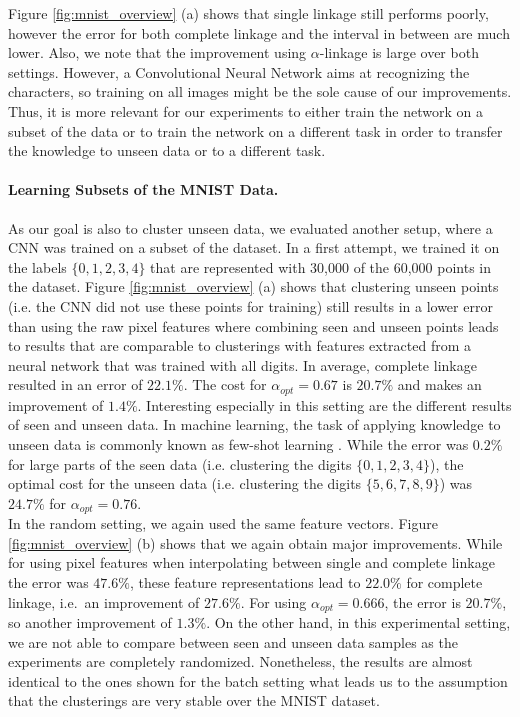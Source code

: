 Figure \ref{fig:mnist_overview} (a) shows that single linkage still performs poorly, however the error for both complete linkage and the interval in between are much lower. Also, we note that the improvement using $\alpha$-linkage is large over both settings. However, a Convolutional Neural Network aims at recognizing the characters, so training on all images might be the sole cause of our improvements. Thus, it is more relevant for our experiments to either train the network on a subset of the data or to train the network on a different task in order to transfer the knowledge to unseen data or to a different task.

\paragraph{Learning Subsets of the MNIST Data.} As our goal is also to cluster unseen data, we evaluated another setup, where a CNN was trained on a subset of the dataset. In a first attempt, we trained it on the labels $\{0,1,2,3,4\}$ that are represented with 30,000 of the 60,000 points in the dataset. Figure \ref{fig:mnist_overview} (a) shows that clustering unseen points (i.e. the CNN did not use these points for training) still results in a lower error than using the raw pixel features where combining seen and unseen points leads to results that are comparable to clusterings with features extracted from a neural network that was trained with all digits. In average, complete linkage resulted in an error of $22.1\%$. The cost for $\alpha_{opt} = 0.67$ is $20.7\%$ and makes an improvement of $1.4\%$. Interesting especially in this setting are the different results of seen and unseen data. In machine learning, the task of applying knowledge to unseen data is commonly known as few-shot learning \cite{ren2018meta}. While the error was $0.2\%$ for large parts of the seen data (i.e. clustering the digits $\{0,1,2,3,4\}$), the optimal cost for the unseen data (i.e. clustering the digits $\{5,6,7,8,9\}$) was $24.7\%$ for $\alpha_{opt} = 0.76$.\\

In the random setting, we again used the same feature vectors. Figure \ref{fig:mnist_overview} (b) shows that we again obtain major improvements. While for using pixel features when interpolating between single and complete linkage the error was $47.6\%$, these feature representations lead to $22.0\%$ for complete linkage, i.e.\ an improvement of $27.6\%$. For using $\alpha_{opt} = 0.666$, the error is $20.7\%$, so another improvement of $1.3\%$. On the other hand, in this experimental setting, we are not able to compare between seen and unseen data samples as the experiments are completely randomized. Nonetheless, the results are almost identical to the ones shown for the batch setting what leads us to the assumption that the clusterings are very stable over the MNIST dataset.

